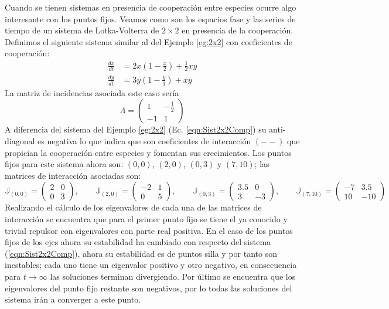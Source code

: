 \begin{ejemplo}\label{eg:2x2CoopyDemás}
	Cuando se tienen sistemas en presencia de cooperación entre especies ocurre algo interesante con los puntos fijos. Veamos como son los espacios fase y las series de tiempo de un sistema de Lotka-Volterra de $2\times 2$ en presencia de la cooperación. Definimos el siguiente sistema similar al del Ejemplo \ref{eg:2x2} con coeficientes de cooperación:
	\begin{equation}\label{eqn:Sist2x2Coop}
		\begin{split}
			\frac{dx}{dt} &= 2x\left (1-\frac{x}{2}\right )+\frac{1}{2}xy\\
			\frac{dy}{dt} &= 3y\left (1-\frac{y}{3}\right )+xy
		\end{split}
	\end{equation}
	La matriz de incidencias asociada este caso sería 
	$$
	\Lambda = \begin{pmatrix}
		1 & -\frac{1}{2}\\
		-1 & 1
	\end{pmatrix}
	$$
	A diferencia del sistema del Ejemplo \ref{eg:2x2} (Ec. \ref{eqn:Sist2x2Comp}) su anti-diagonal es negativa lo que indica que son coeficientes de interacción $(--)$ que propician la cooperación entre especies y fomentan sus crecimientos. Los puntos fijos para este sistema ahora son: $(0,0)$, $(2,0)$, $(0,3)$ y $(7,10)$; las matrices de interacción asociadas son:
	$$
	\mathbb{J}_{(0,0)}=\begin{pmatrix}
		2 & 0 \\
		0 & 3
	\end{pmatrix},\qquad\mathbb{J}_{(2,0)}=\begin{pmatrix}
	-2 & 1\\
	0 & 5
	\end{pmatrix},\qquad\mathbb{J}_{(0,3)}=\begin{pmatrix}
	3.5 & 0 \\
	3 & -3
	\end{pmatrix},\qquad\mathbb{J}_{(7,10)}=\begin{pmatrix}
	-7 & 3.5\\
	10 & -10
	\end{pmatrix}
	$$
	Realizando el cálculo de los eigenvalores de cada una de las matrices de interacción se encuentra que para el primer punto fijo se tiene el ya conocido y trivial repulsor con eigenvalores con parte real positiva. En el caso de los puntos fijos de los ejes ahora su estabilidad ha cambiado con respecto del sistema (\ref{eqn:Sist2x2Comp}), ahora su estabilidad es de puntos silla y por tanto son inestables; cada uno tiene un eigenvalor positivo y otro negativo, en consecuencia para $t\to\infty$ las soluciones terminan divergiendo. Por último se encuentra que los eigenvalores del punto fijo restante son negativos, por lo todas las soluciones del sistema irán a converger a este punto.

\end{ejemplo}
